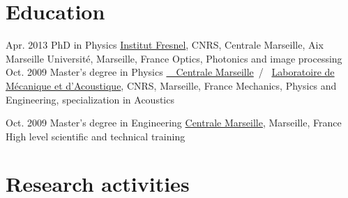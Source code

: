 \documentclass{cv}
\begin{document}

\section{Education}

\begin{entrylist}
	\entry
	{Apr. 2013}
	{PhD {\normalfont in Physics}}
	{\href{http://www.fresnel.fr/}{Institut Fresnel}, CNRS, Centrale Marseille, Aix Marseille Universit\'e, Marseille, France}
	{Optics, Photonics and image processing}
	\entry
	{Oct. 2009}
	{Master's degree {\normalfont in Physics}}
	{\href{http://www.centrale-marseille.fr/}{~~Centrale Marseille}~/~
		\href{http://www.lma.cnrs-mrs.fr/}{Laboratoire de Mécanique et d'Acoustique}, CNRS, Marseille, France}
	{Mechanics, Physics and Engineering, specialization in Acoustics}

	\entry
	{Oct. 2009}
	{Master's degree {\normalfont in Engineering}}
	{\href{http://www.centrale-marseille.fr/}{Centrale Marseille}, Marseille, France}
	{High level scientific and technical training}
\end{entrylist}

\vspace*{-0.2cm}
\section{Research activities}
\end{document}

